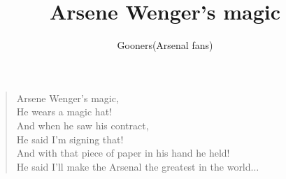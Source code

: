 \documentclass[a4paper,12pt]{article}
\title{Arsene Wenger's magic}
\author{Gooners(Arsenal fans)}
\date{}
\begin{document}
	
	\maketitle
	
	\begin{verse}
		
		Arsene Wenger's magic, \\
		He wears a magic hat! \\ 
		And when he saw his contract, \\ 
		He said I'm signing that! \\ 
		And with that piece of paper in his hand he held! \\ 
		He said I'll make the Arsenal the greatest in the world$\ldots$
		
	\end{verse}
	
\end{document}
